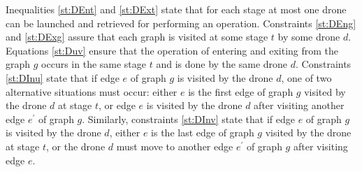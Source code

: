 \noindent 
Inequalities \eqref{st:DEnt} and \eqref{st:DExt} state that for each stage at most one drone can be launched and retrieved for performing an operation.  Constraints \eqref{st:DEng} and \eqref{st:DExg} assure that each graph is visited at some stage $t$ by some drone $d$. Equations \eqref{st:Duv} ensure that the operation of entering and exiting from the graph $g$ occurs in the same stage $t$ and is done by the same drone $d$. Constraints \eqref{st:DInu} state that 
if edge $e$ of graph $g$ is visited by the drone $d$, one of two alternative situations must occur: either $e$ is the first edge of graph $g$ visited by the drone $d$ at stage $t$, or edge $e$ is visited by the drone $d$ after visiting another edge $e^\prime$ of graph $g$. Similarly, constraints \eqref{st:DInv} state that if edge $e$ of graph $g$ is visited by the drone $d$, either $e$ is the last edge of graph $g$ visited by the drone at stage $t$, or the drone $d$ must move to another edge $e^\prime$ of graph $g$ after visiting edge $e$.




